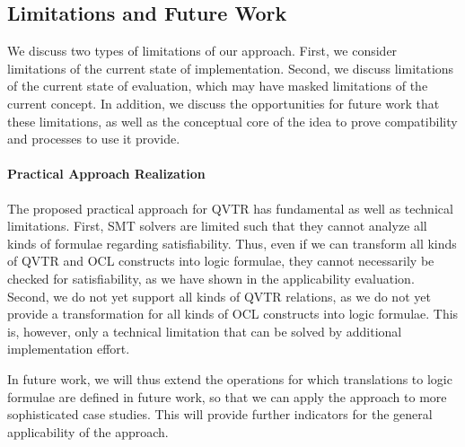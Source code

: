 \subsection{Limitations and Future Work}

We discuss two types of limitations of our approach.
First, we consider limitations of the current state of implementation.
Second, we discuss limitations of the current state of evaluation, which may have masked limitations of the current concept.
In addition, we discuss the opportunities for future work that these limitations, as well as the conceptual core of the idea to prove compatibility and processes to use it provide.


\paragraph{Practical Approach Realization}
The proposed practical approach for \gls{QVTR} has fundamental as well as technical limitations.
First, \gls{SMT} solvers are limited such that they cannot analyze all kinds of formulae regarding satisfiability.
Thus, even if we can transform all kinds of \gls{QVTR} and \gls{OCL} constructs into logic formulae, they cannot necessarily be checked for satisfiability, as we have shown in the applicability evaluation.
Second, we do not yet support all kinds of \gls{QVTR} relations, as we do not yet provide a transformation for all kinds of \gls{OCL} constructs into logic formulae.
This is, however, only a technical limitation that can be solved by additional implementation effort.

In future work, we will thus extend the operations for which translations to logic formulae are defined in future work, so that we can apply the approach to more sophisticated case studies.
This will provide further indicators for the general applicability of the approach.


